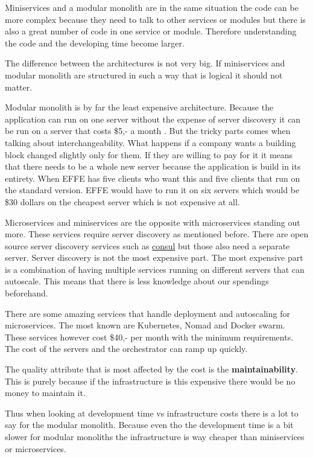 Miniservices and a modular monolith are in the same situation the code can be more complex because they need to talk to other services or modules but there is also a great number of code in one service or module. Therefore understanding the code and the developing time become larger.

The difference between the architectures is not very big. If miniservices and modular monolith are structured in such a way that is logical it should not matter.

Modular monolith is by far the least expensive architecture. Because the application can run on one server without the expense of server discovery it can be run on a server that costs \$5,- a month \cite{digitalOcean}. But the tricky parts comes when talking about interchangeability. What happens if a company wants a building block changed slightly only for them. If they are willing to pay for it it means that there needs to be a whole new server because the application is build in its entirety. When EFFE has five clients who want this and five clients that run on the standard version. EFFE would have to run it on six servers which would be \$30 dollars on the cheapest server which is not expensive at all.

Microservices and miniservices are the opposite with microservices standing out more. These services require server discovery as mentioned before. There are open source server discovery services such as \href{https://www.consul.io/}{consul} but those also need a separate server. Server discovery is not the most expensive part. The most expensive part is a combination of having multiple services running on different servers that can autoscale. This means that there is less knowledge about our spendings beforehand.

There are some amazing services that handle deployment and autoscaling for microservices. The most known are Kubernetes, Nomad and Docker swarm. These services however cost \$40,- per month with the minimum requirements. The cost of the servers and the orchestrator can ramp up quickly.

The quality attribute that is most affected by the cost is the \textbf{maintainability}. This is purely because if the infrastructure is this expensive there would be no money to maintain it.

Thus when looking at development time vs infrastructure costs there is a lot to say for the modular monolith. Because even tho the development time is a bit slower for modular monoliths the infrastructure is way cheaper than miniservices or microservices.

